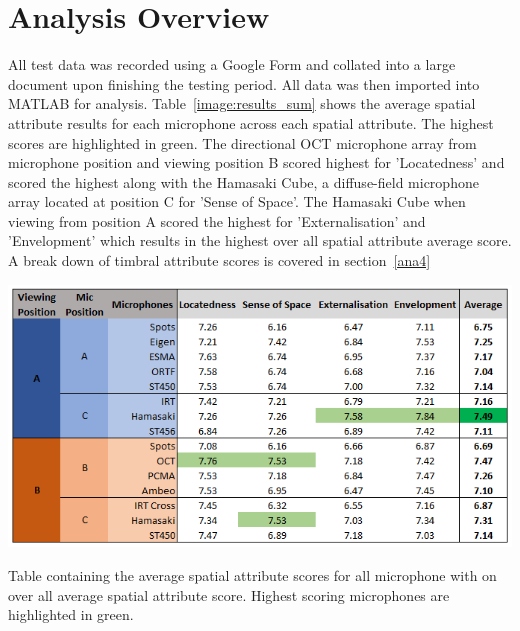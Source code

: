 
















\section{Analysis Overview}

	All test data was recorded using a Google Form and collated into a large document upon finishing the testing period. All data was then imported into MATLAB for analysis. Table~\ref{image:results_sum} shows the average spatial attribute results for each microphone across each spatial attribute. The highest scores are highlighted in green. The directional OCT microphone array from microphone position and viewing position B scored highest for 'Locatedness' and scored the highest along with the Hamasaki Cube, a diffuse-field microphone array located at position C for 'Sense of Space'. The Hamasaki Cube when viewing from position A scored the highest for 'Externalisation' and 'Envelopment' which results in the highest over all spatial attribute average score. A break down of timbral attribute scores is covered in section~\ref{ana4}\\

	\begin{table}
	\begin{center}
		\includegraphics[width=\linewidth]{images/graphs/results_sum_graph_V3.PNG}
		\caption{Table containing the average spatial attribute scores for all microphone with on over all average spatial attribute score. Highest scoring microphones are highlighted in green.}
		\label{image:results_sum} 
	\end{center}
	\end{table}	



